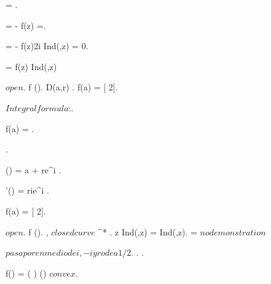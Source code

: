 \documentclass[../Main/main]{subfiles}
\begin{document}
{{{{				 = .

				=  - f(z)  =.

				=  - f(z)2\pi i Ind(\gamma,z) = 0.

				 = f(z) Ind(\gamma,z)

			}
		}
	}


	{
		{
			\Omega \subset \C $ open $.
			f \in \Hc(\Omega).
			D(a,r) \subset \Omega.
		}
		\holds
		{
			f(a) = [ 2\pi ].
		}
		\demonstration
		{
			$Integral formula$:.

			f(a) = .

			.

			\gamma(\theta) = a + re^{i \theta}.

			\gamma'(\theta) = rie^{i \theta}.

			f(a) = [ 2\pi ].
		}
	}
	
	
	{
		{
			\Omega \subset \C $ open $.
			f \in \Hc(\Omega).
			\gamma, \tilde{\gamma} $ closed curve $ \suchthat \gamma^* \subset \Omega.
			z \in \Omega \suchthat Ind(\gamma,z) = Ind(\tilde{\gamma},z).
		}
		\holds
		{
			 = 
		}
		\demonstration
		{
			$ no demonstration $
		}
	}
	
	
	
	
	
	{
		{
			\gamma $ pasa por en medio de i,-i y rodea 1/2 $.
		}
		\holds
		{
			.
			.
		}
		\demonstration
		{
			f(\omega) = \cos( \omega ) \in \Hc(\C) $ convex $.

}}}
\end{document}
